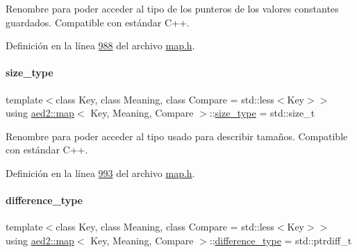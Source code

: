 Renombre para poder acceder al tipo de los punteros de los valores constantes guardados. Compatible con estándar C++. 



Definición en la línea \hyperlink{map_8h_source_l00988}{988} del archivo \hyperlink{map_8h_source}{map.\+h}.

\mbox{\label{classaed2_1_1map_a8cf1c570f605e9c0ad6feb8ce12c9400_a8cf1c570f605e9c0ad6feb8ce12c9400}} 
\paragraph{\texorpdfstring{size\+\_\+type}{size\_type}}
{\footnotesize\ttfamily template$<$class Key, class Meaning, class Compare = std\+::less$<$\+Key$>$$>$ \\
using \hyperlink{classaed2_1_1map}{aed2\+::map}$<$ Key, Meaning, Compare $>$\+::\hyperlink{classaed2_1_1map_a8cf1c570f605e9c0ad6feb8ce12c9400_a8cf1c570f605e9c0ad6feb8ce12c9400}{size\+\_\+type} =  std\+::size\+\_\+t}



Renombre para poder acceder al tipo usado para describir tamaños. Compatible con estándar C++. 



Definición en la línea \hyperlink{map_8h_source_l00993}{993} del archivo \hyperlink{map_8h_source}{map.\+h}.

\mbox{\label{classaed2_1_1map_a2f55b88809000fcbfce1c6cfef1ba74d_a2f55b88809000fcbfce1c6cfef1ba74d}} 
\paragraph{\texorpdfstring{difference\+\_\+type}{difference\_type}}
{\footnotesize\ttfamily template$<$class Key, class Meaning, class Compare = std\+::less$<$\+Key$>$$>$ \\
using \hyperlink{classaed2_1_1map}{aed2\+::map}$<$ Key, Meaning, Compare $>$\+::\hyperlink{classaed2_1_1map_a2f55b88809000fcbfce1c6cfef1ba74d_a2f55b88809000fcbfce1c6cfef1ba74d}{difference\+\_\+type} =  std\+::ptrdiff\+\_\+t}



